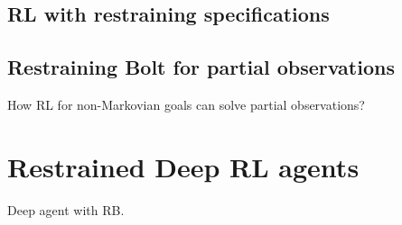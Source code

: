 \subsection[RL with LDLf restraining specifications]%
{RL with \ldl{} restraining specifications}

\label{sec:rb}


\subsection{Restraining Bolt for partial observations}

How RL for non-Markovian goals can solve partial observations?



\section{Restrained Deep RL agents}

\label{sec:rb-deep-model}

Deep agent with RB.
